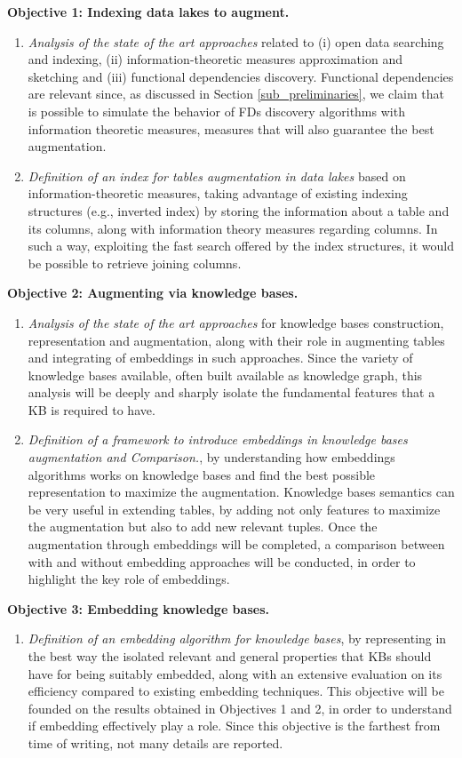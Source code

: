 \bigbreak

\noindent\textbf{Objective 1: Indexing data lakes to augment.}
\begin{enumerate}
    \item \textit{Analysis of the state of the art approaches} related to (i) open data searching and indexing, (ii) information-theoretic measures approximation and sketching and (iii) functional dependencies discovery. Functional dependencies are relevant since, as discussed in Section \ref{sub_preliminaries}, we claim that is possible to simulate the behavior of FDs discovery algorithms with information theoretic measures, measures that will also guarantee the best augmentation. 
    \item \textit{Definition of an index for tables augmentation in data lakes} based on information-theoretic measures, taking advantage of existing indexing structures (e.g., inverted index) by storing the information about a table and its columns, along with information theory measures regarding columns. In such a way, exploiting the fast search offered by the index structures, it would be possible to retrieve joining columns.
\end{enumerate}


\noindent\textbf{Objective 2: Augmenting via knowledge bases.}
\begin{enumerate}
    \item \textit{Analysis of the state of the art approaches} for knowledge bases construction, representation and augmentation, along with their role in augmenting tables and integrating of embeddings in such approaches. Since the variety of knowledge bases available, often built available as knowledge graph, this analysis will be deeply and sharply isolate the fundamental features that a KB is required to have.
    \item \textit{Definition of a framework to introduce embeddings in knowledge bases augmentation and Comparison.}, by understanding how embeddings algorithms works on knowledge bases and find the best possible representation to maximize the augmentation. Knowledge bases semantics can be very useful in extending tables, by adding not only features to maximize the augmentation but also to add new relevant tuples. Once the augmentation through embeddings will be completed, a comparison between with and without embedding approaches will be conducted, in order to highlight the key role of embeddings.
\end{enumerate}

\noindent\textbf{Objective 3: Embedding knowledge bases.}
\begin{enumerate}
    \item \textit{Definition of an embedding algorithm for knowledge bases}, by representing in the best way the isolated relevant and general properties that KBs should have for being suitably embedded, along with an extensive evaluation on its efficiency compared to existing embedding techniques. This objective will be founded on the results obtained in Objectives 1 and 2, in order to understand if embedding effectively play a role. Since this objective is the farthest from time of writing, not many details are reported.
\end{enumerate}

